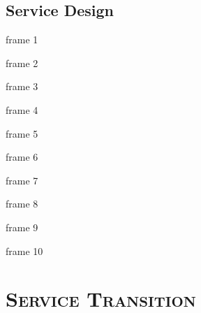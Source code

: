 \documentclass[xcolor=x11names,compress]{beamer}
\renewcommand{\(}{\begin{columns}}
\renewcommand{\)}{\end{columns}}
\newcommand{\<}[1]{\begin{column}{#1}}
\renewcommand{\>}{\end{column}}
\begin{document}
\subsection{Service Design}
\begin{frame}{frame 1}

\end{frame}
\begin{frame}{frame 2}

\end{frame}
\begin{frame}{frame 3}

\end{frame}
\begin{frame}{frame 4}

\end{frame}
\begin{frame}{frame 5}

\end{frame}
\begin{frame}{frame 6}

\end{frame}
\begin{frame}{frame 7}

\end{frame}
\begin{frame}{frame 8}

\end{frame}
\begin{frame}{frame 9}

\end{frame}
\begin{frame}{frame 10}

\end{frame}
\section{\scshape Service Transition}
\end{document}
